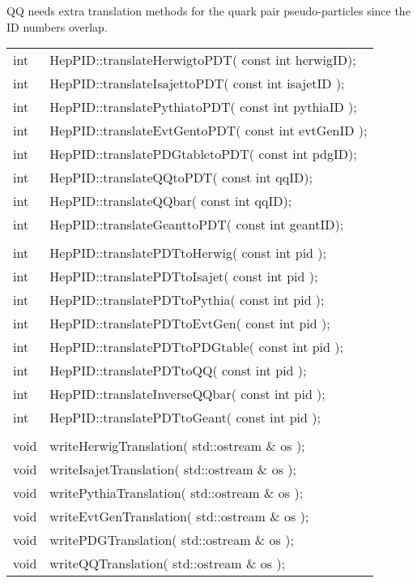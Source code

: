 QQ needs extra translation methods for the 
quark pair pseudo-particles since the ID numbers overlap.

\begin{center}
\begin{tabular}{ll}
int & HepPID::translateHerwigtoPDT( const int herwigID); \\
int & HepPID::translateIsajettoPDT( const int isajetID ); \\
int & HepPID::translatePythiatoPDT( const int pythiaID ); \\
int & HepPID::translateEvtGentoPDT( const int evtGenID ); \\
int & HepPID::translatePDGtabletoPDT( const int pdgID); \\
int & HepPID::translateQQtoPDT( const int qqID); \\
int & HepPID::translateQQbar( const int qqID); \\
int & HepPID::translateGeanttoPDT( const int geantID); \\
 \\
int & HepPID::translatePDTtoHerwig( const int pid ); \\
int & HepPID::translatePDTtoIsajet( const int pid ); \\
int & HepPID::translatePDTtoPythia( const int pid ); \\
int & HepPID::translatePDTtoEvtGen( const int pid ); \\
int & HepPID::translatePDTtoPDGtable( const int pid ); \\
int & HepPID::translatePDTtoQQ( const int pid ); \\
int & HepPID::translateInverseQQbar( const int pid ); \\
int & HepPID::translatePDTtoGeant( const int pid ); \\
 \\
void & writeHerwigTranslation( std::ostream \& os ); \\
void & writeIsajetTranslation( std::ostream \& os ); \\
void & writePythiaTranslation( std::ostream \& os ); \\
void & writeEvtGenTranslation( std::ostream \& os ); \\
void & writePDGTranslation( std::ostream \& os ); \\
void & writeQQTranslation( std::ostream \& os ); \\
\end{tabular}
\end{center}

